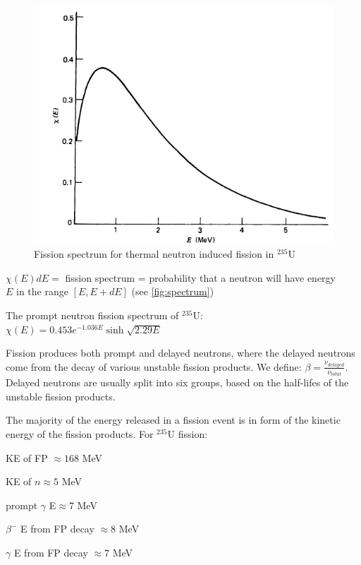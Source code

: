 \documentclass[12pt]{article}
\newif\ifeqns
\begin{document}
\begin{figure}
\begin{center}
\includegraphics[scale=0.6]{../figs/fissionspectrum}
\caption{Fission spectrum for thermal neutron induced fission in $^235$U}
\label{fig:spectrum}
\end{center}
\end{figure}
%
$\chi(E)dE=$ fission spectrum = probability that a neutron will have energy\\ $E$ in the range $[E, E+dE]$ (see \autoref{fig:spectrum})

The prompt neutron fission spectrum of $^{235}$U: $\chi(E) = 0.453 e^{-1.036E}\sinh\sqrt{2.29E}$

Fission produces both prompt and delayed neutrons, where the delayed neutrons come from the decay of various unstable fission products. We define: $\beta=\frac{\nu_{delayed}}{\nu_{total}}$. Delayed neutrons are usually split into six groups, based on the half-lifes of the unstable fission products.

The majority of the energy released in a fission event is in form of the kinetic energy of the fission products. For $^{235}$U fission:

\ifeqns
KE of FP $\approx 168$ MeV

KE of $n\approx 5$ MeV

prompt $\gamma$ E$\approx 7$ MeV

$\beta^- $ E from FP decay $\approx 8$ MeV

$\gamma $ E from FP decay $\approx 7$ MeV
\end{document}
